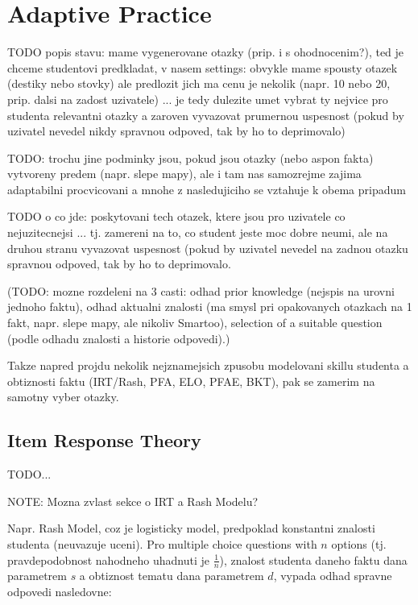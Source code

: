 \documentclass[a4paper, 12pt, twoside]{fithesis2}		%
\renewcommand{\_}{\leavevmode \kern0.07em\vbox{\hrule width0.4em}}
\newcounter{choice}
\begin{document}

\chapter{Adaptive Practice}
\label{chap:practice}

TODO popis stavu: mame vygenerovane otazky (prip. i s ohodnocenim?), ted je chceme studentovi predkladat, v nasem settings: obvykle mame spousty otazek (destiky nebo stovky) ale predlozit jich ma cenu je nekolik (napr. 10 nebo 20, prip. dalsi na zadost uzivatele) ... je tedy dulezite umet vybrat ty nejvice pro studenta relevantni otazky a zaroven vyvazovat prumernou uspesnost (pokud by uzivatel nevedel nikdy spravnou odpoved, tak by ho to deprimovalo)

TODO: trochu jine podminky jsou, pokud jsou otazky (nebo aspon fakta) vytvoreny predem (napr. slepe mapy), ale i tam nas samozrejme zajima adaptabilni procvicovani a mnohe z nasledujiciho se vztahuje k obema pripadum

TODO o co jde: poskytovani tech otazek, ktere jsou pro uzivatele co nejuzitecnejsi ... tj. zamereni na to, co student jeste moc dobre neumi, ale na druhou stranu vyvazovat uspesnost (pokud by uzivatel nevedel na zadnou otazku spravnou odpoved, tak by ho to deprimovalo.

(TODO: mozne rozdeleni na 3 casti: odhad prior knowledge (nejspis na urovni jednoho faktu), odhad aktualni znalosti (ma smysl pri opakovanych otazkach na 1 fakt, napr. slepe mapy, ale nikoliv Smartoo), selection of a suitable question (podle odhadu znalosti a historie odpovedi).)


Takze napred projdu nekolik nejznamejsich zpusobu modelovani skillu studenta a obtiznosti faktu (IRT/Rash, PFA, ELO, PFAE, BKT), pak se zamerim na samotny vyber otazky.


\section{Item Response Theory}
\label{sec:irt}


TODO...

NOTE: Mozna zvlast sekce o IRT a Rash Modelu?

Napr. Rash Model, coz je logisticky model, predpoklad konstantni znalosti studenta (neuvazuje uceni). Pro multiple choice questions with $n$ options (tj. pravdepodobnost nahodneho uhadnuti je $\frac{1}{n}$), znalost studenta daneho faktu dana parametrem $s$ a obtiznost tematu dana parametrem $d$, vypada odhad spravne odpovedi nasledovne:
\end{document}
